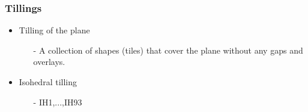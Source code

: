 \documentclass[serif,mathserif, 12pt]{beamer}
\begin{document}
\begin{frame}
  \frametitle{Tillings}
  \begin{itemize}
  \item Tilling of the plane
    \begin{itemize}
    \item[-] A collection of shapes (tiles) that cover the plane without any gaps and overlays.
    \end{itemize}
    \pause
  \item Isohedral tilling
    \begin{itemize}
    \item[-] IH1,...,IH93
    \end{itemize}
  \end{itemize}
\end{frame}
\end{document}
